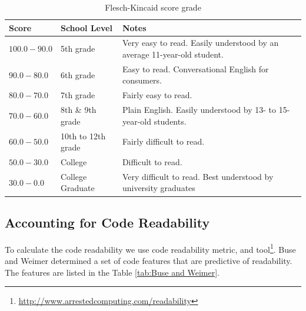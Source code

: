 \documentclass[12pt,mscthesis]{usiinfthesis}
\begin{document}
	\begin {table}[H]
	\begin{center}
    \begin{tabular}{| l | l | p{7cm} | }
    \hline
    \textbf{Score} & \textbf{School Level} & \textbf{Notes} \\ \hline
    $100.0-90.0$ & 5th grade & Very easy to read. Easily understood by an average 11-year-old student.\\ \hline
    $90.0-80.0$ & 6th grade & Easy to read. Conversational English for consumers.\\ \hline
 	$80.0-70.0$ & 7th grade & Fairly easy to read. \\ \hline
	$70.0-60.0$ & 8th \& 9th grade & Plain English. Easily understood by 13- to 15-year-old students.\\ \hline
	$60.0-50.0$ & 10th to 12th grade &  Fairly difficult to read.\\ \hline
	$50.0-30.0$ & College & Difficult to read.\\ \hline
	$30.0-0.0$ & College Graduate & Very difficult to read. Best understood by university graduates\\\hline

    \end{tabular}
	\end{center}
	\caption{Flesch-Kincaid score grade} \label{tab:Flesch-Kincaid} 
	\end{table}

\subsection{Accounting for Code Readability}
	To calculate the code readability we use \citet{Buse:2010:LMC:1850489.1850615} code readability metric, and tool\footnote{\url{http://www.arrestedcomputing.com/readability}}.
	 Buse and Weimer determined a set of code features that are predictive of readability. The features are listed in the Table \ref{tab:Buse and Weimer}.
\end{document}
